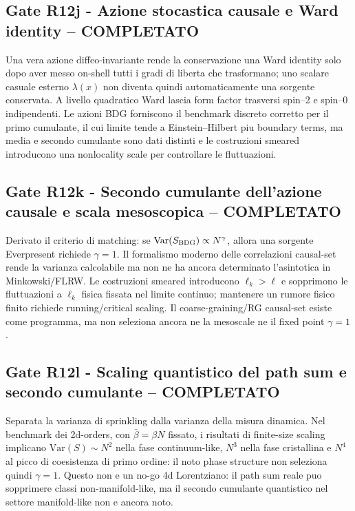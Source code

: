 \documentclass[11pt,a4paper]{article}
\begin{document}
\subsection*{Gate R12j - Azione stocastica causale e Ward identity -- COMPLETATO}
Una vera azione diffeo-invariante rende la conservazione una Ward identity solo dopo aver messo on-shell tutti i gradi di liberta che trasformano; uno scalare casuale esterno $\lambda(x)$ non diventa quindi automaticamente una sorgente conservata. A livello quadratico Ward lascia form factor trasversi spin--2 e spin--0 indipendenti. Le azioni BDG forniscono il benchmark discreto corretto per il primo cumulante, il cui limite tende a Einstein--Hilbert piu boundary terms, ma media e secondo cumulante sono dati distinti e le costruzioni smeared introducono una nonlocality scale per controllare le fluttuazioni.

\subsection*{Gate R12k - Secondo cumulante dell'azione causale e scala mesoscopica -- COMPLETATO}
Derivato il criterio di matching: se $\mathrm{Var}(S_{\rm BDG})\propto N^\gamma$, allora una sorgente Everpresent richiede $\gamma=1$. Il formalismo moderno delle correlazioni causal-set rende la varianza calcolabile ma non ne ha ancora determinato l'asintotica in Minkowski/FLRW. Le costruzioni smeared introducono $\ell_k>\ell$ e sopprimono le fluttuazioni a $\ell_k$ fisica fissata nel limite continuo; mantenere un rumore fisico finito richiede running/critical scaling. Il coarse-graining/RG causal-set esiste come programma, ma non seleziona ancora ne la mesoscale ne il fixed point $\gamma=1$.

\subsection*{Gate R12l - Scaling quantistico del path sum e secondo cumulante -- COMPLETATO}
Separata la varianza di sprinkling dalla varianza della misura dinamica. Nel benchmark dei 2d-orders, con $\bar\beta=\beta N$ fissato, i risultati di finite-size scaling implicano $\mathrm{Var}(S)\sim N^2$ nella fase continuum-like, $N^3$ nella fase cristallina e $N^4$ al picco di coesistenza di primo ordine: il noto phase structure non seleziona quindi $\gamma=1$. Questo non e un no-go 4d Lorentziano: il path sum reale puo sopprimere classi non-manifold-like, ma il secondo cumulante quantistico nel settore manifold-like non e ancora noto.
\end{document}
